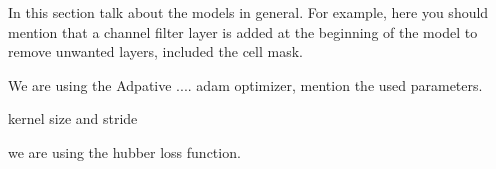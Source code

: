 
\glsresetall
\graphicspath{{./Sections/Methodology/Resources/}}

In this section talk about the models in general. For example, here you should mention that a channel filter layer is added at the beginning of the model to remove unwanted layers, included the cell mask.

We are using the Adpative .... adam optimizer, mention the used parameters.

kernel size and stride

we are using the hubber loss function.
